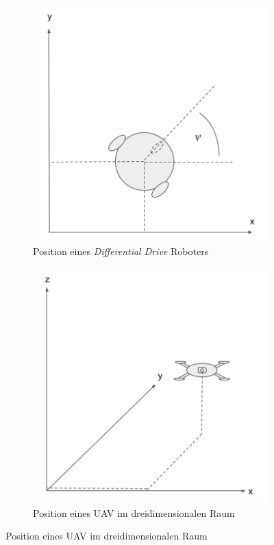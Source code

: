 \mbox{}
\begin{figure}
  \begin{subfigure}{.3\textwidth}
    \centering
    \includegraphics[width=.8\linewidth]{pic/vorwissen/1a_diffdrive.png}
    \caption{Position eines \textit{Differential Drive} Roboters}
    \label{fig:1a_dd}
  \end{subfigure}\hfill
  \begin{subfigure}{.3\textwidth}
    \centering
    \includegraphics[width=.8\linewidth]{pic/vorwissen/1b_uav.png}
    \caption{Position eines UAV im dreidimensionalen Raum}

\end{subfigure}
\end{figure}
